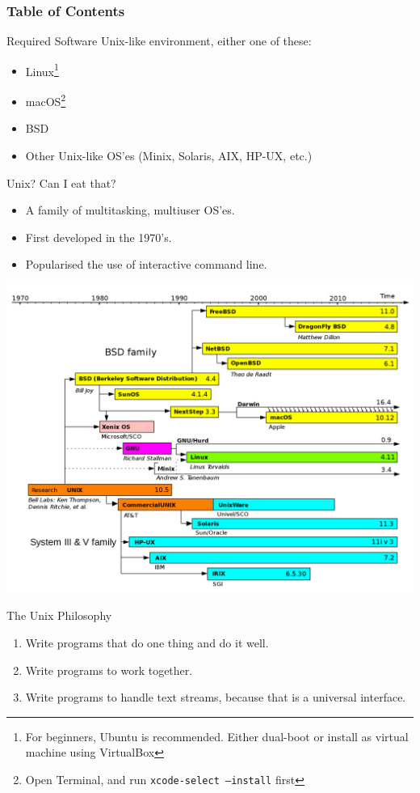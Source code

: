 \documentclass[12pt]{beamer}
\begin{document}
\begin{frame}
  \frametitle{Table of Contents}
  \tableofcontents[sectionstyle=show/show,subsectionstyle=hide/hide/hide]
\end{frame}

\begin{frame}{Required Software}
  Unix-like environment, either one of these:
  \begin{itemize}
    \item Linux\footnote{For beginners, Ubuntu is recommended. Either dual-boot or install as virtual machine using VirtualBox}
    \item macOS\footnote{Open Terminal, and run \texttt{xcode-select --install} first}
    \item BSD
    \item Other Unix-like OS'es (Minix, Solaris, AIX, HP-UX, etc.)
  \end{itemize}
\end{frame}

\begin{frame}{Unix? Can I eat that?}
  \begin{itemize}
    \item A family of multitasking, multiuser OS'es.
    \item First developed in the 1970's.
    \item Popularised the use of interactive command line.
  \end{itemize}
  \begin{center}
    \includegraphics[width=0.6\linewidth]{unix_timeline}
  \end{center}
\end{frame}

\begin{frame}{The Unix Philosophy}
  \begin{enumerate}
    \item Write programs that do one thing and do it well.
    \item Write programs to work together.
    \item Write programs to handle text streams, because that is a universal interface.
  \end{enumerate}
\end{frame}
\end{document}

